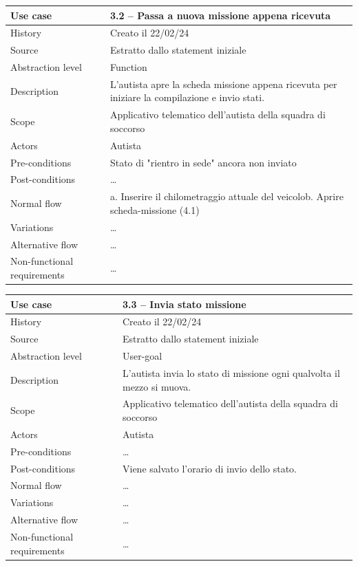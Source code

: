 \documentclass{article}
\begin{document}
    \begin{table}
        \begin{tabularx}{\textwidth}{l|X}
            Use case & \textbf{3.2 – Passa a nuova missione appena ricevuta}\\
            \hline
            History & Creato il 22/02/24\\
            Source & Estratto dallo statement iniziale\\
            Abstraction level & Function\\
            Description & L'autista apre la scheda missione appena ricevuta per iniziare la compilazione e invio stati.\\
            Scope & Applicativo telematico dell'autista della squadra di soccorso\\
            Actors & Autista\\
            Pre-conditions & Stato di "rientro in sede" ancora non inviato \\
            Post-conditions & \dots \\
            Normal flow & a. Inserire il chilometraggio attuale del veicolo\newline b. Aprire scheda-missione (4.1)\\
            Variations & \dots \\
            Alternative flow & \dots \\
            Non-functional requirements & \dots
        \end{tabularx}
        \label{tab:usecase3.2}
    \end{table}

    \begin{table}
        \begin{tabularx}{\textwidth}{l|X}
            Use case & \textbf{3.3 – Invia stato missione}\\
            \hline
            History & Creato il 22/02/24\\
            Source & Estratto dallo statement iniziale\\
            Abstraction level & User-goal\\
            Description & L'autista invia lo stato di missione ogni qualvolta il mezzo si muova.\\
            Scope & Applicativo telematico dell'autista della squadra di soccorso\\
            Actors & Autista\\
            Pre-conditions & \dots \\
            Post-conditions & Viene salvato l'orario di invio dello stato. \\
            Normal flow & \dots\\
            Variations & \dots \\
            Alternative flow & \dots \\
            Non-functional requirements & \dots
        \end{tabularx}
        \label{tab:usecase3.3}
    \end{table}
\end{document}
